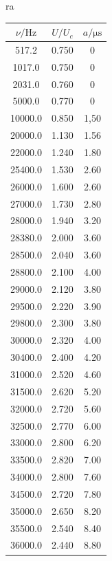 \begin{table}ra
  \centering
  \begin{tabular}{c c c}
    \toprule
    $\nu/\si{\hertz}$ & $U/U_c$ & $a/\si{\micro\second}$ \\
    \midrule
         517.2  &  0.750  &  0     \\
        1017.0  &  0.750  &  0     \\
        2031.0  &  0.760  &  0     \\
        5000.0  &  0.770  &  0     \\
       10000.0  &  0.850  &  1,50  \\
       20000.0  &  1.130  &  1.56  \\
       22000.0  &  1.240  &  1.80  \\
       25400.0  &  1.530  &  2.60  \\
       26000.0  &  1.600  &  2.60  \\
       27000.0  &  1.730  &  2.80  \\
       28000.0  &  1.940  &  3.20  \\
       28380.0  &  2.000  &  3.60  \\
       28500.0  &  2.040  &  3.60  \\
       28800.0  &  2.100  &  4.00  \\
       29000.0  &  2.120  &  3.80  \\
       29500.0  &  2.220  &  3.90  \\
       29800.0  &  2.300  &  3.80  \\
       30000.0  &  2.320  &  4.00  \\
       30400.0  &  2.400  &  4.20  \\
       31000.0  &  2.520  &  4.60  \\
       31500.0  &  2.620  &  5.20  \\
       32000.0  &  2.720  &  5.60  \\
       32500.0  &  2.770  &  6.00  \\
       33000.0  &  2.800  &  6.20  \\
       33500.0  &  2.820  &  7.00  \\
       34000.0  &  2.800  &  7.60  \\
       34500.0  &  2.720  &  7.80  \\
       35000.0  &  2.650  &  8.20  \\
       35500.0  &  2.540  &  8.40  \\
       36000.0  &  2.440  &  8.80  \\

\end{tabular}
\end{table}
